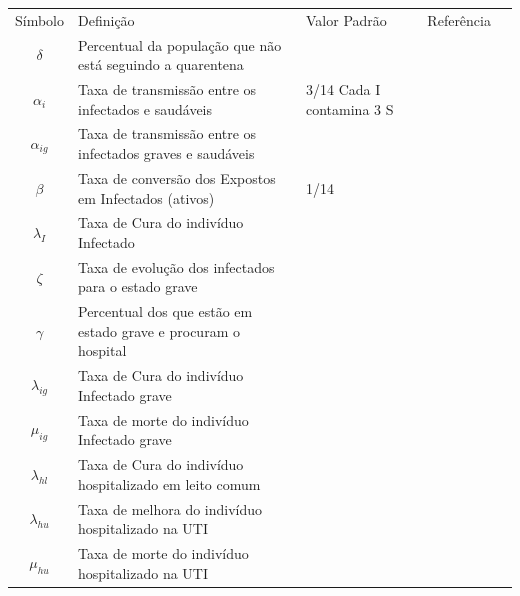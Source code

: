 \documentclass{article}
\begin{document}
\begin{table}[h]
\begin{tabular}{|c|p{7cm}|p{2cm}|l|l}
\cline{1-4}
Símbolo  & Definição                                             & Valor Padrão              & Referência &  \\ \cline{1-4}

$\delta$     & Percentual da população que não está seguindo a quarentena  &  &            &  \\ \cline{1-4}

$\alpha_i$     & Taxa de transmissão entre os infectados e saudáveis   & 3/14 Cada I contamina 3 S &            &  \\ \cline{1-4}

$\alpha_{ig}$     & Taxa de transmissão entre os infectados graves e saudáveis   &  &            &  \\ \cline{1-4}

$\beta$     & Taxa de conversão dos Expostos em Infectados (ativos) & 1/14                      &            &  \\ \cline{1-4}

$\lambda_I$   & Taxa de Cura do indivíduo Infectado                                &                           &            &  \\ \cline{1-4}

$\zeta$     & Taxa de evolução dos infectados para o estado grave &  &            &  \\ \cline{1-4}

$\gamma$     & Percentual dos que estão em estado grave e procuram o hospital &  &            &  \\ \cline{1-4}

$\lambda_{ig}$   & Taxa de Cura do indivíduo Infectado grave                               &                           &            &  \\ \cline{1-4}

$\mu_{ig}$    & Taxa de morte do indivíduo Infectado grave                 &                           &            &  \\ \cline{1-4}

$\lambda_{hl}$   & Taxa de Cura do indivíduo hospitalizado em leito comum                               &                           &            &  \\ \cline{1-4}

$\lambda_{hu}$   & Taxa de melhora do indivíduo hospitalizado  na UTI                             &                           &            &  \\ \cline{1-4}
$\mu_{hu}$   & Taxa de morte do indivíduo hospitalizado  na UTI                             &                           &            &  \\ \cline{1-4}


\end{tabular}
\end{table}
\end{document}
